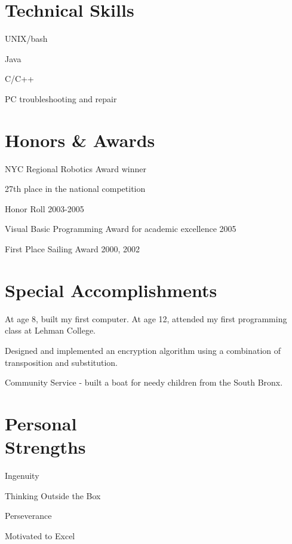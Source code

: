 \documentclass[margin,line]{resume}
\begin{document}
\begin{resume}
\section{\mysidestyle Technical Skills}
	\begin{asparablank}
		\item UNIX/bash
		\item Java
		\item C/C++
		\item PC troubleshooting and repair
	 \end{asparablank}

\section{\mysidestyle Honors \& Awards}
	\begin{asparablank}
		\item NYC Regional Robotics Award winner
		\begin{compactitem}
			\item {\small 27th place in the national competition}
		\end{compactitem}
		\item Honor Roll 2003-2005
		\item Visual Basic Programming Award for academic excellence 2005
		\item First Place Sailing Award 2000, 2002
	\end{asparablank}

\section{\mysidestyle Special Accomplishments}
	\begin{asparablank}
		\item At age 8, built my first computer. At age 12, attended my first
		programming class at Lehman College.
		\item Designed and implemented an encryption algorithm using a
		combination of transposition and substitution.
		\item Community Service - built a boat for needy children from the South
		Bronx.
	\end{asparablank}

\section{\mysidestyle Personal \\ Strengths}
	\begin{asparablank}
		\item Ingenuity
		\item Thinking Outside the Box
		\item Perseverance
		\item Motivated to Excel
	\end{asparablank}


\end{resume}
\end{document}
